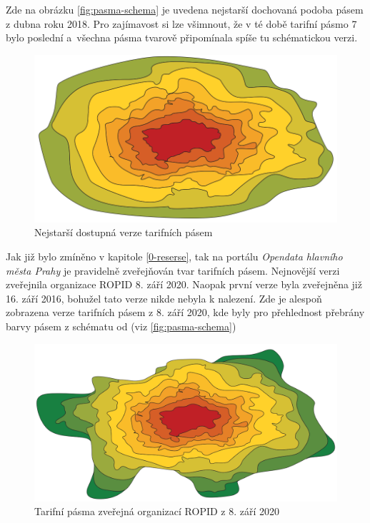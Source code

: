 Zde na obrázku \ref{fig:pasma-schema} je uvedena nejstarší dochovaná podoba pásem z dubna roku 2018.
Pro zajímavost si lze všimnout, že v té době tarifní pásmo 7 bylo poslední a~všechna pásma tvarově připomínala
spíše tu schématickou verzi.

\begin{figure}[H] \centering
    \includegraphics[width=350pt]{./pictures/pasma-nejstarsi.png}
    \caption[Nejstarší dostupná verze tarifních pásem ]{Nejstarší dostupná verze tarifních pásem }
	\label{fig:pasma-nejstarsi}                                
\end{figure}

Jak již bylo zmíněno v kapitole \ref{0-reserse}, tak na portálu \textit{Opendata hlavního města Prahy}
je pravidelně zveřejňován tvar tarifních pásem. Nejnovější verzi zveřejnila organizace ROPID 8. září 2020.
Naopak první verze byla zveřejněna již 16. září 2016, bohužel tato verze nikde nebyla k nalezení.
Zde je alespoň zobrazena verze tarifních pásem z 8. září 2020, kde byly pro přehlednost 
přebrány barvy pásem z schématu od  (viz \ref{fig:pasma-schema})

\begin{figure}[H] \centering
    \includegraphics[width=400pt]{./pictures/pasma-ROPID.png}
    \caption[Tarifní pásma zveřejná organizací ROPID z 8. září 2020]{Tarifní pásma zveřejná organizací ROPID z 8. září 2020}
	\label{fig:pasma-ROPID}                                
\end{figure}


